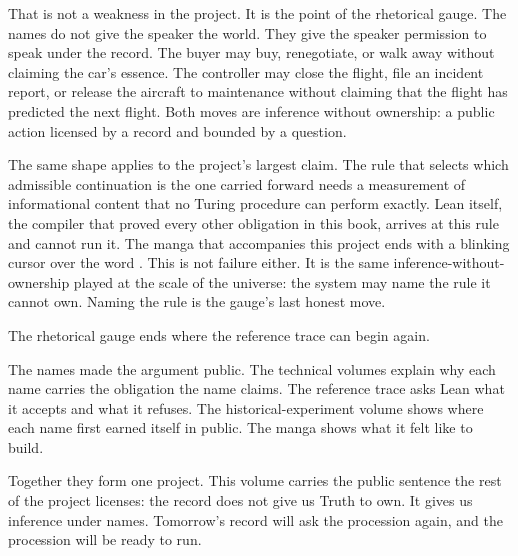 That is not a weakness in the project. It is the point of the
rhetorical gauge. The names do not give the speaker the world. They
give the speaker permission to speak under the record. The buyer may
buy, renegotiate, or walk away without claiming the car's essence. The
controller may close the flight, file an incident report, or release
the aircraft to maintenance without claiming that the flight has
predicted the next flight. Both moves are inference without ownership:
a public action licensed by a record and bounded by a question.

The same shape applies to the project's largest claim. The rule that
selects which admissible continuation is the one carried forward needs
a measurement of informational content that no Turing procedure can
perform exactly. Lean itself, the compiler that proved every other
obligation in this book, arrives at this rule and cannot run it. The
manga that accompanies this project ends with a blinking cursor over
the word . This is not failure either. It is the same
inference-without-ownership played at the scale of the universe: the
system may name the rule it cannot own. Naming the rule is the gauge's
last honest move.

\begin{closingmotion}

The rhetorical gauge ends where the reference trace can begin again.

The names made the argument public. The technical volumes explain why
each name carries the obligation the name claims. The reference trace
asks Lean what it accepts and what it refuses. The historical-experiment
volume shows where each name first earned itself in public. The manga
shows what it felt like to build.

Together they form one project. This volume carries the public sentence
the rest of the project licenses: the record does not give us Truth to
own. It gives us inference under names. Tomorrow's record will ask the
procession again, and the procession will be ready to run.

\end{closingmotion}
